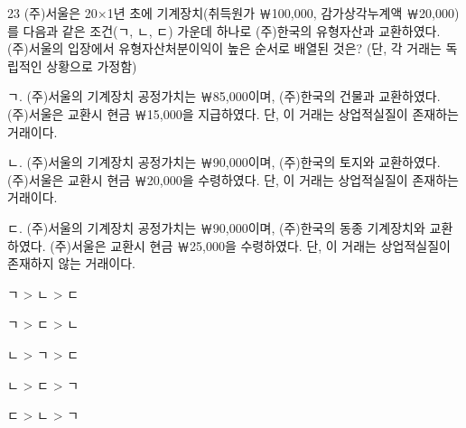 \begin{question}{23}
(주)서울은 20×1년 초에 기계장치(취득원가 ￦100,000, 감가상각누계액 ￦20,000)를 다음과 같은 조건(ㄱ, ㄴ, ㄷ) 가운데 하나로 (주)한국의 유형자산과 교환하였다. (주)서울의 입장에서 유형자산처분이익이 높은 순서로 배열된 것은? (단, 각 거래는 독립적인 상황으로 가정함)
\begin{framedtext}
ㄱ. (주)서울의 기계장치 공정가치는 ￦85,000이며, (주)한국의 건물과 교환하였다. (주)서울은 교환시 현금 ￦15,000을 지급하였다. 단, 이 거래는 상업적실질이 존재하는 거래이다. \par
ㄴ. (주)서울의 기계장치 공정가치는 ￦90,000이며, (주)한국의 토지와 교환하였다. (주)서울은 교환시 현금 ￦20,000을 수령하였다. 단, 이 거래는 상업적실질이 존재하는 거래이다. \par
ㄷ. (주)서울의 기계장치 공정가치는 ￦90,000이며, (주)한국의 동종 기계장치와 교환하였다. (주)서울은 교환시 현금 ￦25,000을 수령하였다. 단, 이 거래는 상업적실질이 존재하지 않는 거래이다. \par
\end{framedtext}
\begin{choices}
  \item ㄱ > ㄴ > ㄷ
  \item ㄱ > ㄷ > ㄴ
  \item ㄴ > ㄱ > ㄷ
  \item ㄴ > ㄷ > ㄱ
  \item ㄷ > ㄴ > ㄱ
\end{choices}
\end{question}
